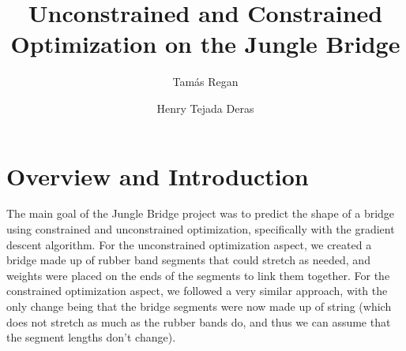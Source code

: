 \documentclass[10pt,letterpaper,onecolumn,report]{tau-class/tau}
\title{Unconstrained and Constrained Optimization on the Jungle Bridge}
\author[1]{Tamás Regan}
\author[1]{Henry Tejada Deras}
\affil[1]{Franklin W. Olin College of Engineering}
\begin{document}
		
    \maketitle 
    \thispagestyle{firststyle} 
    

\section{Overview and Introduction}

    The main goal of the Jungle Bridge project was to predict the shape of a bridge using constrained and unconstrained optimization, specifically with the gradient descent algorithm. For the unconstrained optimization aspect, we created a bridge made up of rubber band segments that could stretch as needed, and weights were placed on the ends of the segments to link them together. For the constrained optimization aspect, we followed a very similar approach, with the only change being that the bridge segments were now made up of string (which does not stretch as much as the rubber bands do, and thus we can assume that the segment lengths don’t change).
\end{document}

